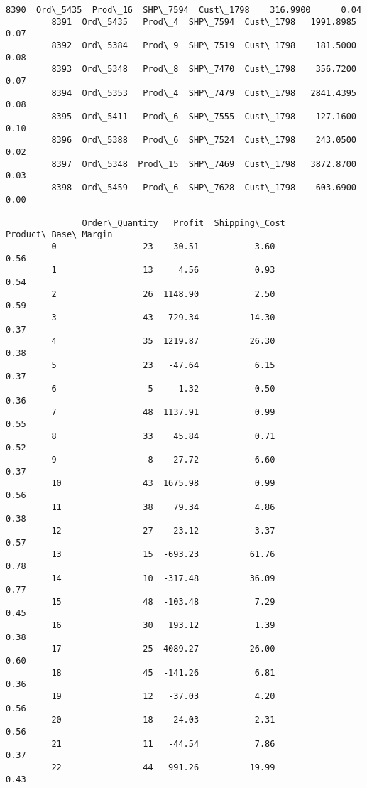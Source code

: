 \documentclass[11pt]{article}
\begin{document}
\begin{Verbatim}[commandchars=\\\{\}]
         8390  Ord\_5435  Prod\_16  SHP\_7594  Cust\_1798    316.9900      0.04   
         8391  Ord\_5435   Prod\_4  SHP\_7594  Cust\_1798   1991.8985      0.07   
         8392  Ord\_5384   Prod\_9  SHP\_7519  Cust\_1798    181.5000      0.08   
         8393  Ord\_5348   Prod\_8  SHP\_7470  Cust\_1798    356.7200      0.07   
         8394  Ord\_5353   Prod\_4  SHP\_7479  Cust\_1798   2841.4395      0.08   
         8395  Ord\_5411   Prod\_6  SHP\_7555  Cust\_1798    127.1600      0.10   
         8396  Ord\_5388   Prod\_6  SHP\_7524  Cust\_1798    243.0500      0.02   
         8397  Ord\_5348  Prod\_15  SHP\_7469  Cust\_1798   3872.8700      0.03   
         8398  Ord\_5459   Prod\_6  SHP\_7628  Cust\_1798    603.6900      0.00   
         
               Order\_Quantity   Profit  Shipping\_Cost  Product\_Base\_Margin  
         0                 23   -30.51           3.60                 0.56  
         1                 13     4.56           0.93                 0.54  
         2                 26  1148.90           2.50                 0.59  
         3                 43   729.34          14.30                 0.37  
         4                 35  1219.87          26.30                 0.38  
         5                 23   -47.64           6.15                 0.37  
         6                  5     1.32           0.50                 0.36  
         7                 48  1137.91           0.99                 0.55  
         8                 33    45.84           0.71                 0.52  
         9                  8   -27.72           6.60                 0.37  
         10                43  1675.98           0.99                 0.56  
         11                38    79.34           4.86                 0.38  
         12                27    23.12           3.37                 0.57  
         13                15  -693.23          61.76                 0.78  
         14                10  -317.48          36.09                 0.77  
         15                48  -103.48           7.29                 0.45  
         16                30   193.12           1.39                 0.38  
         17                25  4089.27          26.00                 0.60  
         18                45  -141.26           6.81                 0.36  
         19                12   -37.03           4.20                 0.56  
         20                18   -24.03           2.31                 0.56  
         21                11   -44.54           7.86                 0.37  
         22                44   991.26          19.99                 0.43  

\end{Verbatim}
\end{document}
